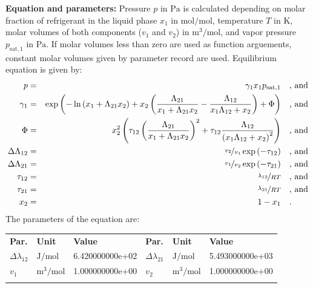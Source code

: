 \textbf{Equation and parameters:}
\newline
%
Pressure $p$ in $\si{\pascal}$ is calculated depending on molar fraction of refrigerant in the liquid phase $x_1$ in $\si{\mole\per\mole}$, temperature $T$ in $\si{\kelvin}$, molar volumes of both components ($v_1$ and $v_2$) in $\si{\cubic\meter\per\mole}$, and vapor pressure $p_\mathrm{sat,1}$ in $\si{\pascal}$. If molar volumes less than zero are used as function arguements, constant molar volumes given by parameter record are used. Equilibrium equation is given by:
%
\begin{equation*}
\begin{split}
p &=& \gamma_1 x_1 p_\mathrm{sat,1} & \quad\text{, and} \\
\gamma_1 &=& \exp \left( - \ln \left( x_1 + \Lambda_{21} x_2 \right) + x_2 \left( \frac{\Lambda_{21}}{x_1 + \Lambda_{21} x_2} - \frac{\Lambda_{12}}{x_1 \Lambda_{12} + x_2} \right) + \Phi \right) & \quad\text{, and} \\
\Phi &=& x_2^2 \left( \tau_{12} \left( \frac{\Lambda_{21}}{x_1 + \Lambda_{21} x_2} \right) ^2 + \tau_{12} \frac{\Lambda_{12}}{\left( x_1 \Lambda_{12} + x_2 \right) ^2}  \right) & \quad\text{, and} \\
\Delta\Lambda_{12} &=& \nicefrac{v_2}{v_1} \exp \left( - \tau_{12} \right) & \quad\text{, and} \\
\Delta\Lambda_{21} &=& \nicefrac{v_1}{v_2} \exp \left( - \tau_{21} \right) & \quad\text{, and} \\
\tau_{12} &=& \nicefrac{\lambda_{12}}{R T} & \quad\text{, and} \\
\tau_{21} &=& \nicefrac{\lambda_{21}}{R T} & \quad\text{, and} \\
x_2 &=& 1 - x_1  & \quad\text{.} \\
\end{split}
\end{equation*}
%
The parameters of the equation are:
%
\begin{longtable}[l]{lll|lll}
\toprule
\addlinespace
\textbf{Par.} & \textbf{Unit} & \textbf{Value} &	\textbf{Par.} & \textbf{Unit} & \textbf{Value} \\
\addlinespace
\midrule
\endhead

\bottomrule
\endfoot
\bottomrule
\endlastfoot
\addlinespace

$\Delta\lambda_{12}$ & $\si{\joule\per\mole}$ & 6.420000000e+02 & $\Delta\lambda_{21}$ & $\si{\joule\per\mole}$ & 5.493000000e+03 \\
$v_1$ & $\si{\cubic\meter\per\mole}$ & 1.000000000e+00 & $v_2$ & $\si{\cubic\meter\per\mole}$ & 1.000000000e+00 \\

\addlinespace\end{longtable}

